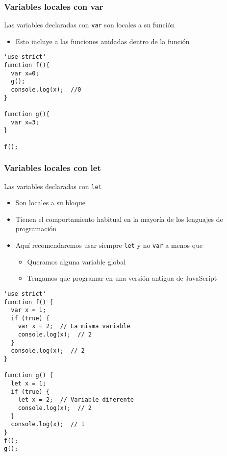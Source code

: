 \documentclass[ucs]{beamer}
\begin{document}
\begin{frame}[fragile]
\frametitle{Variables locales con var}
Las variables declaradas con \verb|var| son locales a su función

    \begin{itemize}
    \item
Esto incluye a las funciones anidadas dentro de la función
    \end{itemize}

  \begin{scriptsize}
  \begin{verbatim}
'use strict'
function f(){
  var x=0;
  g();
  console.log(x);  //0
}

function g(){
  var x=3;
}

f();
  \end{verbatim}
  \end{scriptsize}

\end{frame}


\begin{frame}[fragile]
\frametitle{Variables locales con let}
Las variables declaradas con 
\verb|let|


    \begin{itemize}
    \item
Son locales a su bloque

    \item
Tienen el comportamiento habitual en la mayoría de los lenguajes
de programación

    \item
Aquí recomendaremos usar siempre 
\verb|let|
y no
\verb|var|
a menos que

    \begin{itemize}
    \item
Queramos alguna variable global
    \item
Tengamos que programar en una versión antigua de JavaScript
    \end{itemize}

    \end{itemize}

\end{frame}

\begin{frame}[fragile]

  \begin{scriptsize}
  \begin{verbatim}
'use strict'
function f() {
  var x = 1;
  if (true) {
    var x = 2;  // La misma variable
    console.log(x);  // 2
  }
  console.log(x);  // 2
}

function g() {
  let x = 1;
  if (true) {
    let x = 2;  // Variable diferente
    console.log(x);  // 2
  }
  console.log(x);  // 1
}
f();
g();
  \end{verbatim}
  \end{scriptsize}

\end{frame}
\end{document}
